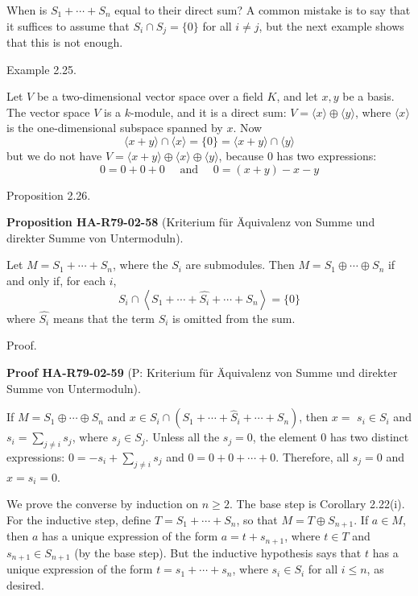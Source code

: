 \documentclass[10pt, letterpaper]{article}
\newcommand{\CustomHeading}[3]{%
  \par\medskip\noindent%
  \textbf{#1 #2} \textnormal{(#3)}.\enskip%
}
\newenvironment{PROP}[2]{\begin{unitbox}\CustomHeading{Proposition}{#1}{#2}}{\end{unitbox}}
\newenvironment{PROOF}[2]{\begin{unitbox}\CustomHeading{Proof}{#1}{#2}}{\end{unitbox}}
\begin{document}
When is $S_{1}+\cdots+S_{n}$ equal to their direct sum? A common mistake is to say that it suffices to assume that $S_{i} \cap S_{j}=\{0\}$ for all $i \neq j$, but the next example shows that this is not enough.

Example 2.25. 

Let $V$ be a two-dimensional vector space over a field $K$, and let $x, y$ be a basis. The vector space $V$ is a $k$-module, and it is a direct sum: $V=\langle x\rangle \oplus\langle y\rangle$, where $\langle x\rangle$ is the one-dimensional subspace spanned by $x$. Now
$$
\langle x+y\rangle \cap\langle x\rangle=\{0\}=\langle x+y\rangle \cap\langle y\rangle
$$
but we do not have $V=\langle x+y\rangle \oplus\langle x\rangle \oplus\langle y\rangle$, because 0 has two expressions:
$$
0=0+0+0 \quad \text { and } \quad 0=(x+y)-x-y
$$



Proposition 2.26. 

\begin{PROP}{HA-R79-02-58}{Kriterium für Äquivalenz von Summe und direkter Summe von Untermoduln}
Let $M=S_{1}+\cdots+S_{n}$, where the $S_{i}$ are submodules. Then $M=S_{1} \oplus \cdots \oplus S_{n}$ if and only if, for each $i$,
$$
S_{i} \cap\left\langle S_{1}+\cdots+\widehat{S_{i}}+\cdots+S_{n}\right\rangle=\{0\}
$$
where $\widehat{S_{i}}$ means that the term $S_{i}$ is omitted from the sum.
\end{PROP}


Proof. 

\begin{PROOF}{HA-R79-02-59}{P: Kriterium für Äquivalenz von Summe und direkter Summe von Untermoduln}
If $M=S_{1} \oplus \cdots \oplus S_{n}$ and $x \in S_{i} \cap\left(S_{1}+\cdots+\widehat{S}_{i}+\cdots+S_{n}\right)$, then $x=$ $s_{i} \in S_{i}$ and $s_{i}=\sum_{j \neq i} s_{j}$, where $s_{j} \in S_{j}$. Unless all the $s_{j}=0$, the element 0 has two distinct expressions: $0=-s_{i}+\sum_{j \neq i} s_{j}$ and $0=0+0+\cdots+0$. Therefore, all $s_{j}=0$ and $x=s_{i}=0$.

We prove the converse by induction on $n \geq 2$. The base step is Corollary 2.22(i). For the inductive step, define $T=S_{1}+\cdots+S_{n}$, so that $M=T \oplus S_{n+1}$. If $a \in M$, then $a$ has a unique expression of the form $a=t+s_{n+1}$, where $t \in T$ and $s_{n+1} \in S_{n+1}$ (by the base step). But the inductive hypothesis says that $t$ has a unique expression of the form $t=s_{1}+\cdots+s_{n}$, where $s_{i} \in S_{i}$ for all $i \leq n$, as desired.
\end{PROOF}
\end{document}
